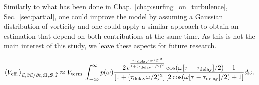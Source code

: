 Similarly to what has been done in Chap.~\ref{chap:surfing_on_turbulence}, Sec.~\ref{sec:partial}, one could improve the model by assuming a Gaussian distribution of vorticity and one could apply a similar approach to obtain an estimation that depend on both contributions at the same time.
As this is not the main interest of this study, we leave these aspects for future research.

\begin{equation}
	\left\langle V_{\mathrm{eff.}} \right\rangle_{\vec{u}, \partial \vec{u} / \partial t, \boldsymbol{\varOmega}, \boldsymbol{S}, \hat{\vec{z}}} \approx V_{\mathrm{term.}} \int_{-\infty}^{\infty} p(\omega) \frac{2 \, e^{\frac{\tau \tau_{\mathrm{delay}} (\omega/2)^2}{1 + (\tau_{\mathrm{delay}} \omega/2)^2}} \cos(\omega [\tau - \tau_{\mathrm{delay}}] / 2) + 1}{\left[ 1 + (\tau_{\mathrm{delay}} \omega/2)^2 \right] \left[ 2 \cos(\omega [\tau - \tau_{\mathrm{delay}}] / 2) + 1 \right]} d\omega.
\end{equation}

% 
